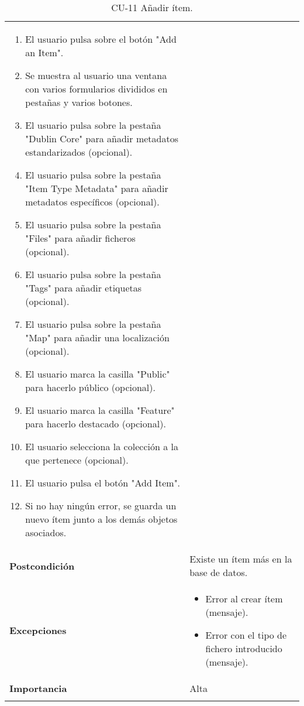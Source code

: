 \begin{longtable}[]{@{}ll@{}}
\begin{minipage}[t]{0.79\columnwidth}
\begin{enumerate}
\tightlist
\item
  El usuario pulsa sobre el botón "Add an Item".
\item
  Se muestra al usuario una ventana con varios formularios divididos en
  pestañas y varios botones.
\item
  El usuario pulsa sobre la pestaña "Dublin Core" para añadir metadatos
  estandarizados (opcional).
\item
  El usuario pulsa sobre la pestaña "Item Type Metadata" para añadir
  metadatos específicos (opcional).
\item
  El usuario pulsa sobre la pestaña "Files" para añadir ficheros
  (opcional).
\item
  El usuario pulsa sobre la pestaña "Tags" para añadir etiquetas
  (opcional).
\item
  El usuario pulsa sobre la pestaña "Map" para añadir una localización
  (opcional).
\item
  El usuario marca la casilla "Public" para hacerlo público (opcional).
\item
  El usuario marca la casilla "Feature" para hacerlo destacado
  (opcional).
\item
  El usuario selecciona la colección a la que pertenece (opcional).
\item
  El usuario pulsa el botón "Add Item".
\item
  Si no hay ningún error, se guarda un nuevo ítem junto a los demás objetos asociados.
  
\end{enumerate}\strut
\end{minipage}\tabularnewline
\begin{minipage}[t]{0.15\columnwidth}\raggedright
\textbf{Postcondición}\strut
\end{minipage} & \begin{minipage}[t]{0.79\columnwidth}\raggedright
Existe un ítem más en la base de datos.\strut
\end{minipage}\tabularnewline
\begin{minipage}[t]{0.15\columnwidth}\raggedright
\textbf{Excepciones}\strut
\end{minipage} & \begin{minipage}[t]{0.79\columnwidth}\raggedright
\begin{itemize}
\tightlist
\item
  Error al crear ítem (mensaje).
\item
  Error con el tipo de fichero introducido (mensaje).
\end{itemize}\strut
\end{minipage}\tabularnewline
\begin{minipage}[t]{0.15\columnwidth}\raggedright
\textbf{Importancia}\strut
\end{minipage} & \begin{minipage}[t]{0.79\columnwidth}\raggedright
Alta\strut
\end{minipage}\tabularnewline
\bottomrule
\caption{CU-11 Añadir ítem.}
\end{longtable}

